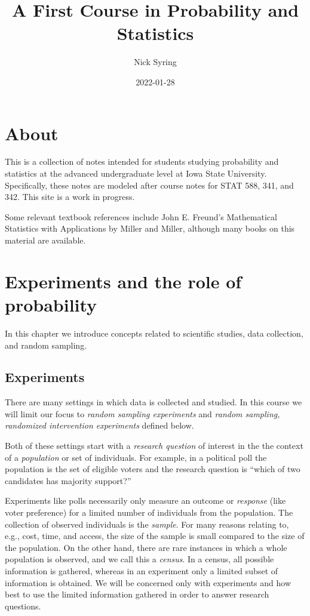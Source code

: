\documentclass[]{book}
\title{A First Course in Probability and Statistics}
\author{Nick Syring}
\date{2022-01-28}
\begin{document}
\maketitle

{
\setcounter{tocdepth}{1}
\tableofcontents
}
\chapter{About}\label{about}

This is a collection of notes intended for students studying probability
and statistics at the advanced undergraduate level at Iowa State
University. Specifically, these notes are modeled after course notes for
STAT 588, 341, and 342. This site is a work in progress.

Some relevant textbook references include John E. Freund's Mathematical
Statistics with Applications by Miller and Miller, although many books
on this material are available.

\chapter{Experiments and the role of
probability}\label{experiments-and-the-role-of-probability}

In this chapter we introduce concepts related to scientific studies,
data collection, and random sampling.

\section{Experiments}\label{experiments}

There are many settings in which data is collected and studied. In this
course we will limit our focus to \emph{random sampling experiments} and
\emph{random sampling, randomized intervention experiments} defined
below.

Both of these settings start with a \emph{research question} of interest
in the the context of a \emph{population} or set of individuals. For
example, in a political poll the population is the set of eligible
voters and the research question is ``which of two candidates has
majority support?''

Experiments like polls necessarily only measure an outcome or
\emph{response} (like voter preference) for a limited number of
individuals from the population. The collection of observed individuals
is the \emph{sample}. For many reasons relating to, e.g., cost, time,
and access, the size of the sample is small compared to the size of the
population. On the other hand, there are rare instances in which a whole
population is observed, and we call this a \emph{census}. In a census,
all possible information is gathered, whereas in an experiment only a
limited subset of information is obtained. We will be concerned only
with experiments and how best to use the limited information gathered in
order to answer research questions.
\end{document}
